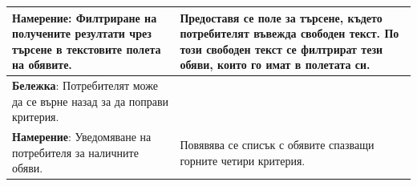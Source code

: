 \documentclass[12pt]{beamer}
\begin{document}
\begin{frame}[fragile]
\begin{center}
{\begin{tabular}{ |p{7cm}|p{12cm}| }
    \textbf{Намерение}: Филтриране на получените резултати чрез търсене в текстовите полета на обявите. & Предоставя се поле за търсене, където потребителят въвежда свободен текст. По този свободен текст се филтрират тези обяви, които го имат в полетата си. \\    \hline
    \textbf{Бележка}: Потребителят може да се върне назад за да поправи критерия. & \\    \hline
    \textbf{Намерение}: Уведомяване на потребителя за наличните обяви. & Повявява се списък с обявите спазващи горните четири критерия. \\    \hline
  \end{tabular}
  }
\end{center}

\end{frame}
\end{document}
